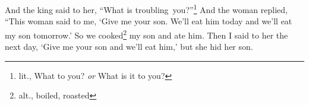 \begin{inparaenum}
     And the king said to her, ``What is troubling\understood\ you?''\footnote{lit., What to you? \textit{or} What is it to you?} And the woman replied, ``This woman said to me, `Give me your son. We'll eat him today and we'll eat my son tomorrow.'%
     So we cooked\footnote{alt., boiled, roasted} my son and ate him. Then I said to her the next day, `Give me your son and we'll eat him,' but she hid her son.%
\end{inparaenum}
